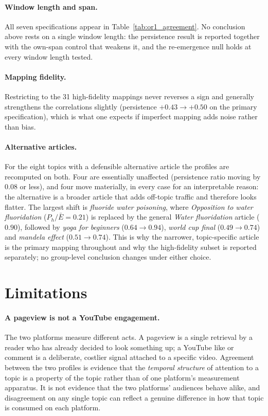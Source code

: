 \documentclass[11pt]{article}
\begin{document}
\paragraph{Window length and span.}
All seven specifications appear in Table~\ref{tab:or1_agreement}. No conclusion
above rests on a single window length: the persistence result is reported
together with the own-span control that weakens it, and the re-emergence null
holds at every window length tested.

\paragraph{Mapping fidelity.}
Restricting to the 31 high-fidelity mappings never reverses a sign and generally
strengthens the correlations slightly (persistence $+0.43 \to +0.50$ on the
primary specification), which is what one expects if imperfect mapping adds noise
rather than bias.

\paragraph{Alternative articles.}
For the eight topics with a defensible alternative article the profiles are
recomputed on both. Four are essentially unaffected (persistence ratio moving by
$0.08$ or less), and four move materially, in every case for an interpretable
reason: the alternative is a broader article that adds off-topic traffic and
therefore looks flatter. The largest shift is \emph{fluoride water poisoning},
where \emph{Opposition to water fluoridation} ($P_h/\bar{E} = 0.21$) is replaced
by the general \emph{Water fluoridation} article ($0.90$), followed by
\emph{yoga for beginners} ($0.64 \to 0.94$), \emph{world cup final}
($0.49 \to 0.74$) and \emph{mandela effect} ($0.51 \to 0.74$). This is why the
narrower, topic-specific article is the primary mapping throughout and why the
high-fidelity subset is reported separately; no group-level conclusion changes
under either choice.



\section{Limitations}
\label{sec:or1_limits}

\paragraph{A pageview is not a YouTube engagement.}
The two platforms measure different acts. A pageview is a single retrieval by a
reader who has already decided to look something up; a YouTube like or comment is
a deliberate, costlier signal attached to a specific video. Agreement between the
two profiles is evidence that the \emph{temporal structure} of attention to a
topic is a property of the topic rather than of one platform's measurement
apparatus. It is not evidence that the two platforms' audiences behave alike, and
disagreement on any single topic can reflect a genuine difference in how that
topic is consumed on each platform.
\end{document}
